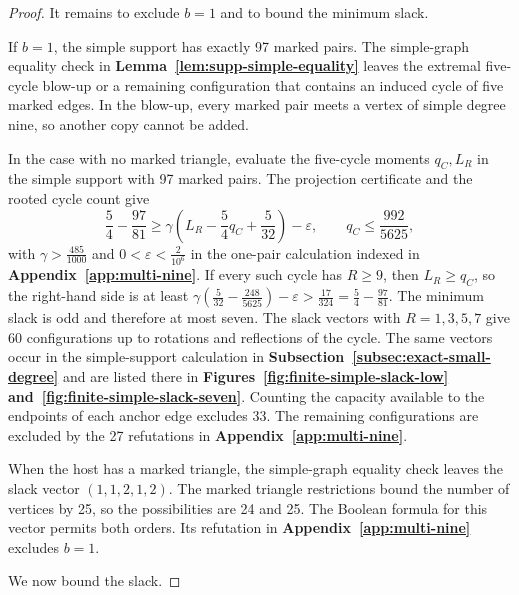 \documentclass[preprint,11pt,numbers]{elsarticle-arxiv}
\numberwithin{equation}{section}
\theoremstyle{definition}
\begin{document}
\begin{proof}
It remains to exclude $b=1$ and to bound the minimum slack.

If $b=1$, the simple support has exactly 97 marked pairs.
The simple-graph equality check in \textbf{Lemma~\ref{lem:supp-simple-equality}}
leaves the extremal five-cycle blow-up or a remaining
configuration that contains an induced cycle of five
marked edges. In the blow-up, every marked pair meets a
vertex of simple degree nine, so another copy cannot be
added.

In the case with no marked triangle, evaluate the five-cycle moments
$q_C,L_R$ in the simple support with 97 marked pairs. The projection
certificate and the rooted cycle count give
\[
 \frac54-\frac{97}{81}\geq
 \gamma\left(L_R-\frac54 q_C+\frac5{32}\right)-\varepsilon,
 \qquad q_C\leq\frac{992}{5625},
\]
with $\gamma>\frac{485}{1000}$ and $0<\varepsilon<\frac{2}{10^6}$
in the one-pair calculation indexed in \textbf{Appendix~\ref{app:multi-nine}}.
If every such cycle has $R\ge9$, then $L_R\geq q_C$, so the
right-hand side is at least
$\gamma(\frac5{32}-\frac{248}{5625})-\varepsilon>
\frac{17}{324}=\frac54-\frac{97}{81}$.
The minimum slack is odd and therefore at most seven. The slack
vectors with $R=1,3,5,7$ give 60 configurations up to
rotations and reflections of the cycle. The same vectors occur in the
simple-support calculation in \textbf{Subsection~\ref{subsec:exact-small-degree}}
and are listed there in \textbf{Figures~\ref{fig:finite-simple-slack-low}
and~\ref{fig:finite-simple-slack-seven}}. Counting the
capacity available to the endpoints of each anchor edge
excludes 33. The remaining configurations are excluded by the
27 refutations in \textbf{Appendix~\ref{app:multi-nine}}.

When the host has a marked triangle, the simple-graph
equality check leaves the slack vector $(1,1,2,1,2)$.
The marked triangle restrictions bound the number of
vertices by 25, so the possibilities are 24 and 25.
The Boolean formula for this vector permits both orders. Its
refutation in \textbf{Appendix~\ref{app:multi-nine}} excludes $b=1$.

We now bound the slack.


\end{proof}
\end{document}
